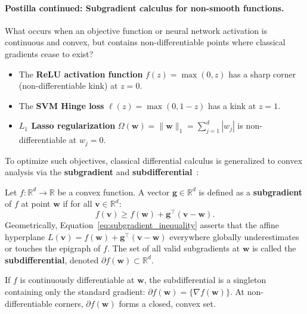 \paragraph{Postilla continued: Subgradient calculus for non-smooth functions.}
\label{sec:subgradient_calculus}
What occurs when an objective function or neural network activation is continuous and convex, but contains non-differentiable points where classical gradients cease to exist?
\begin{itemize}[noitemsep,topsep=2pt,parsep=0pt,partopsep=0pt]
  \item The \textbf{ReLU activation function} $f(z) = \max(0, z)$ has a sharp corner (non-differentiable kink) at $z = 0$.
  \item The \textbf{SVM Hinge loss} $\ell(z) = \max(0, 1 - z)$ has a kink at $z = 1$.
  \item \textbf{$L_1$ Lasso regularization} $\Omega(\mathbf{w}) = \|\mathbf{w}\|_1 = \sum_{j=1}^d |w_j|$ is non-differentiable at $w_j = 0$.
\end{itemize}
To optimize such objectives, classical differential calculus is generalized to convex analysis via the \textbf{subgradient} and \textbf{subdifferential}~\cite{bishop2024deep,goodfellow2016deep}:

\begin{definition}
Let $f: \mathbb{R}^d \to \mathbb{R}$ be a convex function. A vector $\mathbf{g} \in \mathbb{R}^d$ is defined as a \textbf{subgradient} of $f$ at point $\mathbf{w}$ if for all $\mathbf{v} \in \mathbb{R}^d$:
\begin{equation}
f(\mathbf{v}) \ge f(\mathbf{w}) + \mathbf{g}^\top (\mathbf{v} - \mathbf{w}).
\label{eq:subgradient_inequality}
\end{equation}
Geometrically, Equation~\eqref{eq:subgradient_inequality} asserts that the affine hyperplane $L(\mathbf{v}) = f(\mathbf{w}) + \mathbf{g}^\top (\mathbf{v} - \mathbf{w})$ everywhere globally underestimates or touches the epigraph of $f$. The set of all valid subgradients at $\mathbf{w}$ is called the \textbf{subdifferential}, denoted $\partial f(\mathbf{w}) \subset \mathbb{R}^d$.
\end{definition}

If $f$ is continuously differentiable at $\mathbf{w}$, the subdifferential is a singleton containing only the standard gradient: $\partial f(\mathbf{w}) = \{\nabla f(\mathbf{w})\}$. At non-differentiable corners, $\partial f(\mathbf{w})$ forms a closed, convex set.

